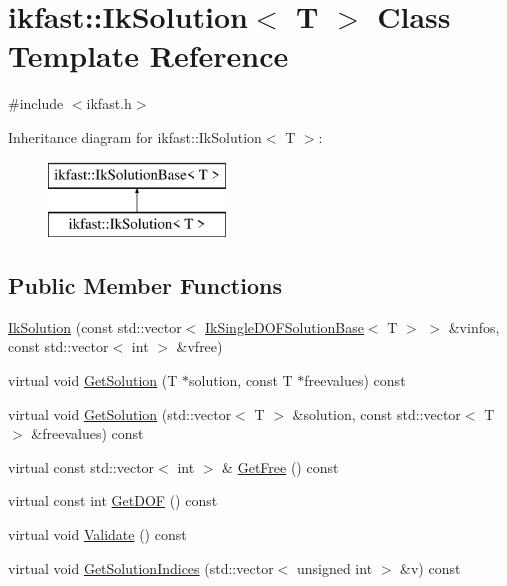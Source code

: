 \hypertarget{classikfast_1_1IkSolution}{\section{ikfast\-:\-:Ik\-Solution$<$ T $>$ Class Template Reference}
\label{classikfast_1_1IkSolution}
}


{\ttfamily \#include $<$ikfast.\-h$>$}

Inheritance diagram for ikfast\-:\-:Ik\-Solution$<$ T $>$\-:\begin{figure}[H]
\begin{center}
\leavevmode
\includegraphics[height=2.000000cm]{classikfast_1_1IkSolution}
\end{center}
\end{figure}
\subsection*{Public Member Functions}
\begin{DoxyCompactItemize}
\item 
\hyperlink{classikfast_1_1IkSolution_a6b76af506a24ba4b78b1c9d3dc110a72}{Ik\-Solution} (const std\-::vector$<$ \hyperlink{classikfast_1_1IkSingleDOFSolutionBase}{Ik\-Single\-D\-O\-F\-Solution\-Base}$<$ T $>$ $>$ \&vinfos, const std\-::vector$<$ int $>$ \&vfree)
\item 
virtual void \hyperlink{classikfast_1_1IkSolution_a197868105dffb498bec69c38318283a2}{Get\-Solution} (T $\ast$solution, const T $\ast$freevalues) const 
\item 
virtual void \hyperlink{classikfast_1_1IkSolution_a56a7305f2111808478f85a43ecc5e6aa}{Get\-Solution} (std\-::vector$<$ T $>$ \&solution, const std\-::vector$<$ T $>$ \&freevalues) const 
\item 
virtual const std\-::vector$<$ int $>$ \& \hyperlink{classikfast_1_1IkSolution_a31267c02ff31436b0bfe3672bcecce5e}{Get\-Free} () const 
\item 
virtual const int \hyperlink{classikfast_1_1IkSolution_a8d46fe7ed5a582f9ad3f4bfc86b41297}{Get\-D\-O\-F} () const 
\item 
virtual void \hyperlink{classikfast_1_1IkSolution_ad61847499fe76751629f70047f8b0a69}{Validate} () const 
\item 
virtual void \hyperlink{classikfast_1_1IkSolution_ae6b77cab94b40369712a099cc21d42e8}{Get\-Solution\-Indices} (std\-::vector$<$ unsigned int $>$ \&v) const 
\end{DoxyCompactItemize}
